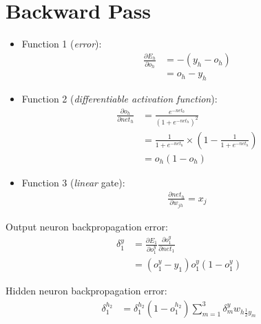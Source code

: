 \documentclass[
	number={8},
	title={Artificial Neural Network}
]{cs584notes}
\begin{document}
\section{Backward Pass}\label{sec:backward-pass}
\begin{itemize}
	\item Function 1 (\emph{error}):
	\begin{equation*}
	\begin{aligned}
		\frac{\partial E_{h}}{\partial o_{h}} &= -(y_{h} - o_{h})\\
		&= o_{h} - y_{h}
	\end{aligned}
	\end{equation*}
	\item Function 2 (\emph{differentiable activation function}):
	\begin{equation*}
	\begin{aligned}
		\frac{\partial o_{h}}{\partial net_{h}} &= \frac{e^{-net_{h}}}{\left( 1 + e^{-net_{h}} \right)^{2}}\\
		&= \frac{1}{1 + e^{-net_{h}}} \times \left( 1 - \frac{1}{1 + e^{-net_{h}}} \right)\\
		&= o_{h}(1 - o_{h})
	\end{aligned}
	\end{equation*}
	\item Function 3 (\emph{linear} gate):
	\begin{equation*}
	\begin{aligned}
		\frac{\partial net_{h}}{\partial w_{jh}} = x_{j}
	\end{aligned}
	\end{equation*}
\end{itemize}

Output neuron backpropagation error:
\begin{equation}
	\begin{aligned}
		\delta_{1}^{y} &= \frac{\partial E_{1}}{\partial o_{1}^{y}}\frac{\partial o_{1}^{y}}{\partial net_{1}}\\
		&= (o_{1}^{y} - y_{1})o_{1}^{y}(1 - o_{1}^{y})
	\end{aligned}
	\label{eq:output-backprop-error}
\end{equation}

Hidden neuron backpropagation error:
\begin{equation}
	\begin{aligned}
		\delta_{1}^{h_{2}} &= \delta_{1}^{h_{2}}(1 - o_{1}^{h_{2}}) \sum_{m=1}^{3} \delta_{m}^{y}w_{h\frac{1}{2}y_{m}}
	\end{aligned}
	\label{eq:hidden-backprop-error}
\end{equation}
\end{document}
